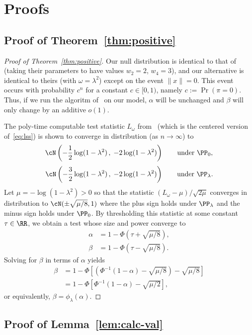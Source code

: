 \documentclass[11pt]{article}
\begin{document}
\section{Proofs}
\label{sec:proofs}

\subsection{Proof of Theorem~\ref{thm:positive}}

\begin{proof}[Proof of Theorem~\ref{thm:positive}]
Our null distribution is identical to that of~\cite{weak-wigner} (taking their parameters to have values $w_2 = 2$, $w_4 = 3$), and our alternative is identical to theirs (with $\omega = \lambda^2$) except on the event $\|x\| = 0$. This event occurs with probability $c^n$ for a constant $c \in [0,1)$, namely $c := \Pr(\pi = 0)$. Thus, if we run the algoritm of~\cite{weak-wigner} on our model, $\alpha$ will be unchanged and $\beta$ will only change by an additive $o(1)$.

The poly-time computable test statistic $L_\omega$ from~\cite{weak-wigner} (which is the centered version of~\eqref{eq:lss}) is shown to converge in distribution (as $n \to \infty$) to
\[ \cN\left(-\frac{1}{2} \log(1-\lambda^2) \, , \; -2\log(1-\lambda^2)\right) \qquad \text{under } \PP_0, \]
\[ \cN\left(-\frac{3}{2} \log(1-\lambda^2) \, , \; -2\log(1-\lambda^2)\right) \qquad \text{under } \PP_\lambda. \]
Let $\mu = -\log(1-\lambda^2) > 0$ so that the statistic $(L_\omega - \mu)/\sqrt{2\mu}$ converges in distribution to $\cN(\pm \sqrt{\mu/8}, 1)$ where the plus sign holds under $\PP_\lambda$ and the minus sign holds under $\PP_0$. By thresholding this statistic at some constant $\tau \in \RR$, we obtain a test whose size and power converge to
\begin{align*}
\alpha &= 1-\Phi(\tau+\sqrt{\mu/8}), \\
\beta &= 1-\Phi(\tau-\sqrt{\mu/8}).
\end{align*}
Solving for $\beta$ in terms of $\alpha$ yields
\begin{align*}
\beta &= 1 - \Phi\left[\left(\Phi^{-1}(1-\alpha) - \sqrt{\mu/8}\right) - \sqrt{\mu/8}\right] \\
&= 1 - \Phi\left[\Phi^{-1}(1-\alpha) - \sqrt{\mu/2}\right],
\end{align*}
or equivalently, $\beta = \phi_\lambda(\alpha)$.
\end{proof}


\subsection{Proof of Lemma~\ref{lem:calc-val}}
\end{document}
